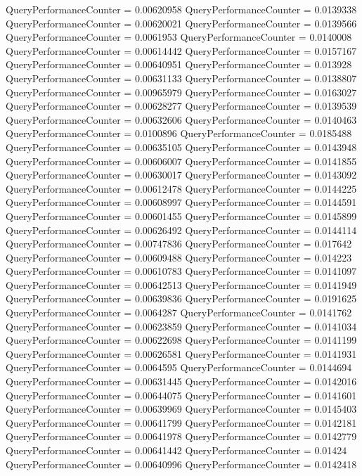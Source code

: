 \documentclass[9pt]{article}
\theoremstyle{plain}
\theoremstyle{definition}
\theoremstyle{remark}
\numberwithin{equation}{section}
\begin{document}
QueryPerformanceCounter  =  0.00620958
QueryPerformanceCounter  =  0.0139338
QueryPerformanceCounter  =  0.00620021
QueryPerformanceCounter  =  0.0139566
QueryPerformanceCounter  =  0.0061953
QueryPerformanceCounter  =  0.0140008
QueryPerformanceCounter  =  0.00614442
QueryPerformanceCounter  =  0.0157167
QueryPerformanceCounter  =  0.00640951
QueryPerformanceCounter  =  0.013928
QueryPerformanceCounter  =  0.00631133
QueryPerformanceCounter  =  0.0138807
QueryPerformanceCounter  =  0.00965979
QueryPerformanceCounter  =  0.0163027
QueryPerformanceCounter  =  0.00628277
QueryPerformanceCounter  =  0.0139539
QueryPerformanceCounter  =  0.00632606
QueryPerformanceCounter  =  0.0140463
QueryPerformanceCounter  =  0.0100896
QueryPerformanceCounter  =  0.0185488
QueryPerformanceCounter  =  0.00635105
QueryPerformanceCounter  =  0.0143948
QueryPerformanceCounter  =  0.00606007
QueryPerformanceCounter  =  0.0141855
QueryPerformanceCounter  =  0.00630017
QueryPerformanceCounter  =  0.0143092
QueryPerformanceCounter  =  0.00612478
QueryPerformanceCounter  =  0.0144225
QueryPerformanceCounter  =  0.00608997
QueryPerformanceCounter  =  0.0144591
QueryPerformanceCounter  =  0.00601455
QueryPerformanceCounter  =  0.0145899
QueryPerformanceCounter  =  0.00626492
QueryPerformanceCounter  =  0.0144114
QueryPerformanceCounter  =  0.00747836
QueryPerformanceCounter  =  0.017642
QueryPerformanceCounter  =  0.00609488
QueryPerformanceCounter  =  0.014223
QueryPerformanceCounter  =  0.00610783
QueryPerformanceCounter  =  0.0141097
QueryPerformanceCounter  =  0.00642513
QueryPerformanceCounter  =  0.0141949
QueryPerformanceCounter  =  0.00639836
QueryPerformanceCounter  =  0.0191625
QueryPerformanceCounter  =  0.0064287
QueryPerformanceCounter  =  0.0141762
QueryPerformanceCounter  =  0.00623859
QueryPerformanceCounter  =  0.0141034
QueryPerformanceCounter  =  0.00622698
QueryPerformanceCounter  =  0.0141199
QueryPerformanceCounter  =  0.00626581
QueryPerformanceCounter  =  0.0141931
QueryPerformanceCounter  =  0.0064595
QueryPerformanceCounter  =  0.0144694
QueryPerformanceCounter  =  0.00631445
QueryPerformanceCounter  =  0.0142016
QueryPerformanceCounter  =  0.00644075
QueryPerformanceCounter  =  0.0141601
QueryPerformanceCounter  =  0.00639969
QueryPerformanceCounter  =  0.0145403
QueryPerformanceCounter  =  0.00641799
QueryPerformanceCounter  =  0.0142181
QueryPerformanceCounter  =  0.00641978
QueryPerformanceCounter  =  0.0142779
QueryPerformanceCounter  =  0.00641442
QueryPerformanceCounter  =  0.01424
QueryPerformanceCounter  =  0.00640996
QueryPerformanceCounter  =  0.0142418
\end{document}
